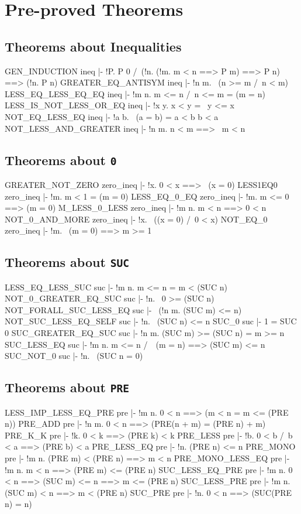 \chapter{Pre-proved Theorems}\label{thms}

\section{Theorems about Inequalities}
\THEOREM GEN\_INDUCTION ineq
|- !P. P 0 /\ (!n. (!m. m < n ==> P m) ==> P n) ==> (!n. P n)
\ENDTHEOREM
\THEOREM GREATER\_EQ\_ANTISYM ineq
|- !n m. ~(n >= m /\ n < m)
\ENDTHEOREM
\THEOREM LESS\_EQ\_LESS\_EQ\_EQ ineq
|- !m n. m <= n /\ n <= m = (m = n)
\ENDTHEOREM
\THEOREM LESS\_IS\_NOT\_LESS\_OR\_EQ ineq
|- !x y. x < y = ~y <= x
\ENDTHEOREM
\THEOREM NOT\_EQ\_LESS\_EQ ineq
|- !a b. ~(a = b) = a < b \/ b < a
\ENDTHEOREM
\THEOREM NOT\_LESS\_AND\_GREATER ineq
|- !n m. n < m ==> ~m < n
\ENDTHEOREM
\section{Theorems about {\tt 0}}
\THEOREM GREATER\_NOT\_ZERO zero\_ineq
|- !x. 0 < x ==> ~(x = 0)
\ENDTHEOREM
\THEOREM LESS1EQ0 zero\_ineq
|- !m. m < 1 = (m = 0)
\ENDTHEOREM
\THEOREM LESS\_EQ\_0\_EQ zero\_ineq
|- !m. m <= 0 ==> (m = 0)
\ENDTHEOREM
\THEOREM M\_LESS\_0\_LESS zero\_ineq
|- !m n. m < n ==> 0 < n
\ENDTHEOREM
\THEOREM NOT\_0\_AND\_MORE zero\_ineq
|- !x. ~((x = 0) /\ 0 < x)
\ENDTHEOREM
\THEOREM NOT\_EQ\_0 zero\_ineq
|- !m. ~(m = 0) ==> m >= 1
\ENDTHEOREM
\section{Theorems about {\tt SUC}}
\THEOREM LESS\_EQ\_LESS\_SUC suc
|- !m n. m <= n = m < (SUC n)
\ENDTHEOREM
\THEOREM NOT\_0\_GREATER\_EQ\_SUC suc
|- !n. ~0 >= (SUC n)
\ENDTHEOREM
\THEOREM NOT\_FORALL\_SUC\_LESS\_EQ suc
|- ~(!n m. (SUC m) <= n)
\ENDTHEOREM
\THEOREM NOT\_SUC\_LESS\_EQ\_SELF suc
|- !n. ~(SUC n) <= n
\ENDTHEOREM
\THEOREM SUC\_0 suc
|- 1 = SUC 0
\ENDTHEOREM
\THEOREM SUC\_GREATER\_EQ\_SUC suc
|- !n m. (SUC m) >= (SUC n) = m >= n
\ENDTHEOREM
\THEOREM SUC\_LESS\_EQ suc
|- !m n. m <= n /\ ~(m = n) ==> (SUC m) <= n
\ENDTHEOREM
\THEOREM SUC\_NOT\_0 suc
|- !n. ~(SUC n = 0)
\ENDTHEOREM
\section{Theorems about {\tt PRE}}
\THEOREM LESS\_IMP\_LESS\_EQ\_PRE pre
|- !m n. 0 < n ==> (m < n = m <= (PRE n))
\ENDTHEOREM
\THEOREM PRE\_ADD pre
|- !n m. 0 < n ==> (PRE(n + m) = (PRE n) + m)
\ENDTHEOREM
\THEOREM PRE\_K\_K pre
|- !k. 0 < k ==> (PRE k) < k
\ENDTHEOREM
\THEOREM PRE\_LESS pre
|- !b. 0 < b /\ b < a ==> (PRE b) < a
\ENDTHEOREM
\THEOREM PRE\_LESS\_EQ pre
|- !n. (PRE n) <= n
\ENDTHEOREM
\THEOREM PRE\_MONO pre
|- !m n. (PRE m) < (PRE n) ==> m < n
\ENDTHEOREM
\THEOREM PRE\_MONO\_LESS\_EQ pre
|- !m n. m < n ==> (PRE m) <= (PRE n)
\ENDTHEOREM
\THEOREM SUC\_LESS\_EQ\_PRE pre
|- !m n. 0 < n ==> (SUC m) <= n ==> m <= (PRE n)
\ENDTHEOREM
\THEOREM SUC\_LESS\_PRE pre
|- !m n. (SUC m) < n ==> m < (PRE n)
\ENDTHEOREM
\THEOREM SUC\_PRE pre
|- !n. 0 < n ==> (SUC(PRE n) = n)
\ENDTHEOREM
